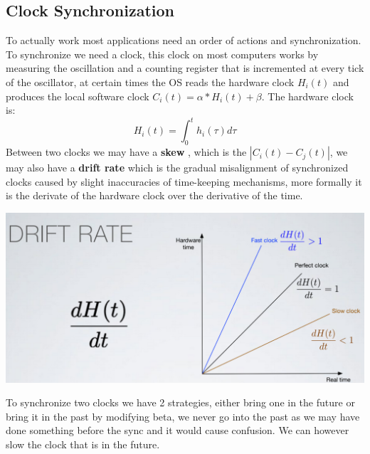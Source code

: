 \documentclass[11pt, a4paper]{article}
\begin{document}
\subsection{Clock Synchronization}
To actually work most applications need an order of actions and synchronization.\\
To synchronize we need a clock, this clock on most computers works by  measuring the oscillation and a counting register that is incremented at every tick of the oscillator, at certain times the OS reads the hardware clock $H_i (t)$ and produces the local software clock $C_i (t) = \alpha * H_i (t) + \beta$.
The hardware clock is: $$ H_i (t) = \int_{0}^{t} h_i(\tau)d\tau$$
Between two clocks we may have a \textbf{skew} , which is the $|C_i (t) - C_j (t)|$, we may also have a \textbf{drift rate} which is the gradual misalignment of synchronized clocks caused by slight inaccuracies of time-keeping mechanisms, more formally it is the derivate of the hardware clock over the derivative of the time.
\begin{center}
    \includegraphics[scale=0.5]{img/clocks/dr.png}
\end{center}
To synchronize two clocks we have 2 strategies, either bring one in the future or bring it in the past by modifying beta, we never go into the past as we may have done something before the sync and it would cause confusion. We can however slow the clock that is in the future.
\end{document}
